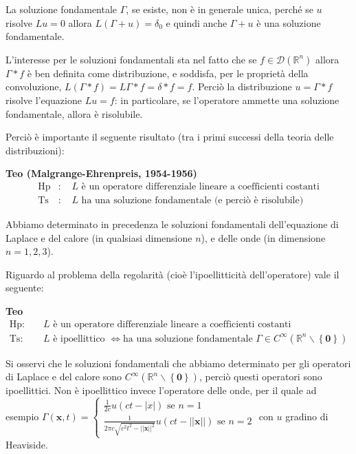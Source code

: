 \documentclass{article}
\begin{document}
La soluzione fondamentale $\Gamma $, se esiste, non \`{e} in generale
unica, perch\'{e} se $u$ risolve $Lu=0$ allora $L(\Gamma +u)=\delta_0 $ e
quindi anche $\Gamma +u$ \`{e} una soluzione fondamentale.

L'interesse per le soluzioni fondamentali sta nel fatto che se $f\in 
\mathcal{D}\left( 
\mathbb{R}
^{n}\right) $ allora $\Gamma \ast f$ \`{e} ben definita come distribuzione,
e soddisfa, per le propriet\`{a} della convoluzione, $L\left( \Gamma \ast
f\right) =L\Gamma \ast f=\delta \ast f=f$. Perci\`{o} la distribuzione $%
u=\Gamma \ast f$ risolve l'equazione $Lu=f$: in particolare, se l'operatore
ammette una soluzione fondamentale, allora \`{e} risolubile.

Perci\`{o} \`{e} importante il seguente risultato (tra i primi successi
della teoria delle distribuzioni):

\textbf{Teo (Malgrange-Ehrenpreis, 1954-1956)} 
\begin{eqnarray*}
\text{Hp} &\text{: }&L\text{ \`{e} un operatore differenziale lineare a
coefficienti costanti} \\
\text{Ts} &\text{: }&L\text{ ha una soluzione fondamentale (e perci\`{o} 
\`{e} risolubile)}
\end{eqnarray*}

Abbiamo determinato in precedenza le soluzioni fondamentali dell'equazione
di Laplace e del calore (in qualsiasi dimensione $n$), e delle onde (in
dimensione $n=1,2,3$).

Riguardo al problema della regolarit\`{a} (cio\`{e} l'ipoellitticit\`{a}
dell'operatore) vale il seguente:

\textbf{Teo} 
\begin{eqnarray*}
\text{Hp}\text{: } &&L\text{ \`{e} un operatore differenziale lineare a
coefficienti costanti} \\
\text{Ts}\text{: } &&L\text{ \`{e} ipoellittico }\Longleftrightarrow \text{
ha una soluzione fondamentale }\Gamma \in C^{\infty }\left( 
\mathbb{R}
^{n}\backslash \left\{ \mathbf{0}\right\} \right)
\end{eqnarray*}

Si osservi che le soluzioni fondamentali che abbiamo determinato per gli
operatori di Laplace e del calore sono $C^{\infty }\left( 
\mathbb{R}
^{n}\backslash \left\{ \mathbf{0}\right\} \right) $, perci\`{o} questi
operatori sono ipoellittici. Non \`{e} ipoellittico invece l'operatore delle
onde, per il quale ad esempio $\Gamma \left( \mathbf{x},t\right) =\left\{ 
\begin{array}{c}
\frac{1}{2c}u\left( ct-\left\vert x\right\vert \right) \text{ se }n=1 \\ 
\frac{1}{2\pi c\sqrt{c^{2}t^{2}-\left\vert \left\vert \mathbf{x}\right\vert
\right\vert ^{2}}}u\left( ct-\left\vert \left\vert \mathbf{x}\right\vert
\right\vert \right) \text{ se }n=2%
\end{array}%
\right. $ con $u$ gradino di Heaviside.
\end{document}
